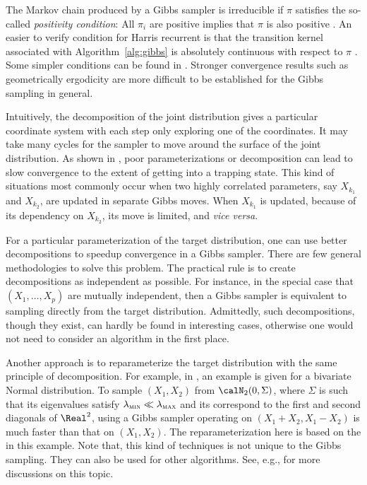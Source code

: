 

The Markov chain produced by a Gibbs sampler is irreducible if $\pi$ satisfies the so-called \emph{positivity condition}: All $\pi_i$ are positive implies that $\pi$ is also positive \cite[][Theorem~10.8]{Robert:2004tn}. An easier to verify condition for Harris recurrent is that the transition kernel associated with Algorithm~\ref{alg:gibbs} is absolutely continuous with respect to $\pi$ \cite{Tierney:1994uk}. Some simpler conditions can be found in \cite{Hobert:1997vx}. Stronger convergence results such as geometrically ergodicity are more difficult to be established for the Gibbs sampling in general.

Intuitively, the decomposition of the joint distribution gives a particular coordinate system with each step only exploring one of the coordinates. It may take many cycles for the sampler to move around the surface of the joint distribution. As shown in \cite[][note~9.7.1]{Robert:2004tn}, poor parameterizations or decomposition can lead to slow convergence to the extent of getting into a trapping state. This kind of situations most commonly occur when two highly correlated parameters, say $X_{k_1}$ and $X_{k_2}$, are updated in separate Gibbs moves. When $X_{k_1}$ is updated, because of its dependency on $X_{k_2}$, its move is limited, and \emph{vice versa}.

For a particular parameterization of the target distribution, one can use better decompositions to speedup convergence in a Gibbs sampler. There are few general methodologies to solve this problem. The practical rule is to create decompositions as independent as possible. For instance, in the special case that $(X_1,\dots,X_p)$ are mutually independent, then a Gibbs sampler is equivalent to sampling directly from the target distribution. Admittedly, such decompositions, though they exist, can hardly be found in interesting cases, otherwise one would not need to consider an \mcmc algorithm in the first place.

Another approach is to reparameterize the target distribution with the same principle of decomposition. For example, in \cite[][sec.~10.4.1]{Robert:2004tn}, an example is given for a bivariate Normal distribution. To sample $(X_1,X_2)$ from $\calN_2(0, \Sigma)$, where $\Sigma$ is such that its eigenvalues satisfy $\lambda_{\text{\textsc{min}}} \ll \lambda_{\text{\textsc{max}}}$ and its  correspond to the first and second diagonals of $\Real^2$, using a Gibbs sampler operating on $(X_1 + X_2, X_1 - X_2)$ is much faster than that on $(X_1,X_2)$. The reparameterization here is based on the  in this example. Note that, this kind of techniques is not unique to the Gibbs sampling. They can also be used for other \mcmc algorithms. See, e.g., \cite{Hills:1993vb,Gilks:1996vx} for more discussions on this topic.

